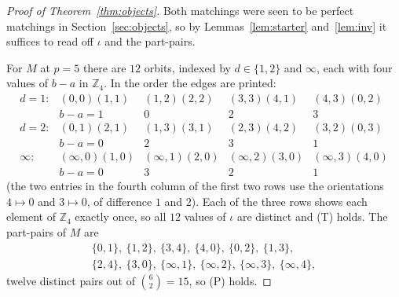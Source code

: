 \documentclass[11pt]{amsart}
\theoremstyle{remark}
\newcommand{\Zp}{\mathbb Z}
\begin{document}
\begin{proof}[Proof of Theorem~\ref{thm:objects}]
Both matchings were seen to be perfect matchings in Section~\ref{sec:objects},
so by Lemmas~\ref{lem:starter} and~\ref{lem:inv} it suffices to read off
$\iota$ and the part-pairs.

For $M$ at $p=5$ there are $12$ orbits, indexed by
$d\in\{1,2\}$ and $\infty$, each with four values of $b-a$ in $\Zp_4$. In the
order the edges are printed:
\[
\begin{array}{lcccc}
 d=1: & (0,0)(1,1) & (1,2)(2,2) & (3,3)(4,1) & (4,3)(0,2)\\
      & b-a=1 & 0 & 2 & 3\\[4pt]
 d=2: & (0,1)(2,1) & (1,3)(3,1) & (2,3)(4,2) & (3,2)(0,3)\\
      & b-a=0 & 2 & 3 & 1\\[4pt]
 \infty: & (\infty,0)(1,0) & (\infty,1)(2,0) & (\infty,2)(3,0) &
 (\infty,3)(4,0)\\
      & b-a=0 & 3 & 2 & 1
\end{array}
\]
(the two entries in the fourth column of the first two rows use the
orientations $4\mapsto0$ and $3\mapsto0$, of difference $1$ and $2$). Each of
the three rows shows each element of $\Zp_4$ exactly once, so all $12$ values
of $\iota$ are distinct and (T) holds. The part-pairs of $M$ are
\[
\begin{gathered}
 \{0,1\},\ \{1,2\},\ \{3,4\},\ \{4,0\},\ \{0,2\},\ \{1,3\},\\
 \{2,4\},\ \{3,0\},\ \{\infty,1\},\ \{\infty,2\},\ \{\infty,3\},\
 \{\infty,4\},
\end{gathered}
\]
twelve distinct pairs out of $\binom62=15$, so (P) holds.


\end{proof}
\end{document}
